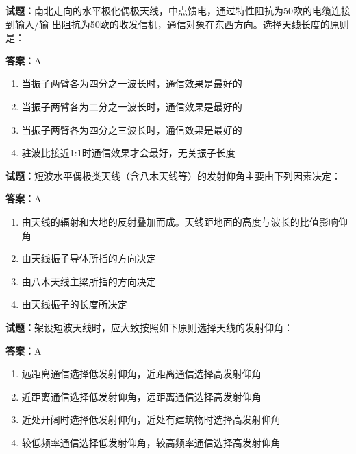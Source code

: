\documentclass{ctexbook}
\begin{document}
\textbf{试题：}南北走向的水平极化偶极天线，中点馈电，通过特性阻抗为50欧的电缆连接到输入/输
出阻抗为50欧的收发信机，通信对象在东西方向。选择天线长度的原则是： 

\textbf{答案：}A 

\begin{enumerate}[leftmargin=3em]
  \item 当振子两臂各为四分之一波长时，通信效果是最好的 

  \item 当振子两臂各为二分之一波长时，通信效果是最好的 

  \item 当振子两臂各为四分之三波长时，通信效果是最好的 

  \item 驻波比接近1:1时通信效果才会最好，无关振子长度 

\end{enumerate}





\vspace{1em}

\textbf{试题：}短波水平偶极类天线（含八木天线等）的发射仰角主要由下列因素决定： 

\textbf{答案：}A 

\begin{enumerate}[leftmargin=3em]
  \item 由天线的辐射和大地的反射叠加而成。天线距地面的高度与波长的比值影响仰角 

  \item 由天线振子导体所指的方向决定 

  \item 由八木天线主梁所指的方向决定 

  \item 由天线振子的长度所决定 

\end{enumerate}





\vspace{1em}

\textbf{试题：}架设短波天线时，应大致按照如下原则选择天线的发射仰角： 

\textbf{答案：}A 


\begin{enumerate}[leftmargin=3em]
  \item 远距离通信选择低发射仰角，近距离通信选择高发射仰角 

  \item 近距离通信选择低发射仰角，远距离通信选择高发射仰角 

  \item 近处开阔时选择低发射仰角，近处有建筑物时选择高发射仰角 

  \item 较低频率通信选择低发射仰角，较高频率通信选择高发射仰角 

\end{enumerate}
\end{document}
